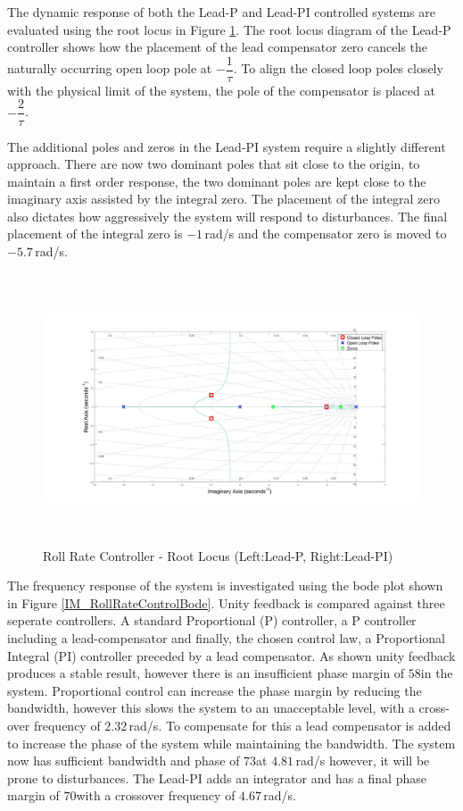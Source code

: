 \documentclass[12pt]{report}
\begin{document}
The dynamic response of both the Lead-P and Lead-PI controlled systems are evaluated using the root locus in Figure \ref{IM_RollRateControlRoot}. The root locus diagram of the Lead-P controller shows how the placement of the lead compensator zero cancels the naturally occurring open loop pole at $-\dfrac{1}{\tau}$. To align the closed loop poles closely with the physical limit of the system, the pole of the compensator is placed at $-\dfrac{2}{\tau}$. 

The additional poles and zeros in the Lead-PI system require a slightly different approach. There are now two dominant poles that sit close to the origin, to maintain a first order response, the two dominant poles are kept close to the imaginary axis assisted by the integral zero. The placement of the integral zero also dictates how aggressively the system will respond to disturbances. The final placement of the integral zero is $-1$\,rad/s and the compensator zero is moved to $-5.7$\,rad/s.

\begin{figure}[H]
	\centering
	\includegraphics[height = 8cm]{../Design/Matlab/Controllers/roll_rate_root.jpg}
	\caption{Roll Rate Controller -  Root Locus (Left:Lead-P, Right:Lead-PI)}
	\label{IM_RollRateControlRoot}
\end{figure}

The frequency response of the system is investigated using the bode plot shown in Figure \ref{IM_RollRateControlBode}. Unity feedback is compared against three seperate controllers. A standard Proportional (P) controller, a P controller including a lead-compensator and finally, the chosen control law, a Proportional Integral (PI) controller preceded by a lead compensator. As shown unity feedback produces a stable result, however there is an insufficient phase margin of $58$\textdegree in the system. Proportional control can increase the phase margin by reducing the bandwidth, however this slows the system to an unacceptable level, with a cross-over frequency of $2.32$\,rad/s. To compensate for this a lead compensator is added to increase the phase of the system while maintaining the bandwidth. The system now has sufficient bandwidth and phase of $73$\textdegree at $4.81$\,rad/s however, it will be prone to disturbances.  The Lead-PI adds an integrator and has a final phase margin of $70$\textdegree with a crossover frequency of $4.67$\,rad/s.
\end{document}
